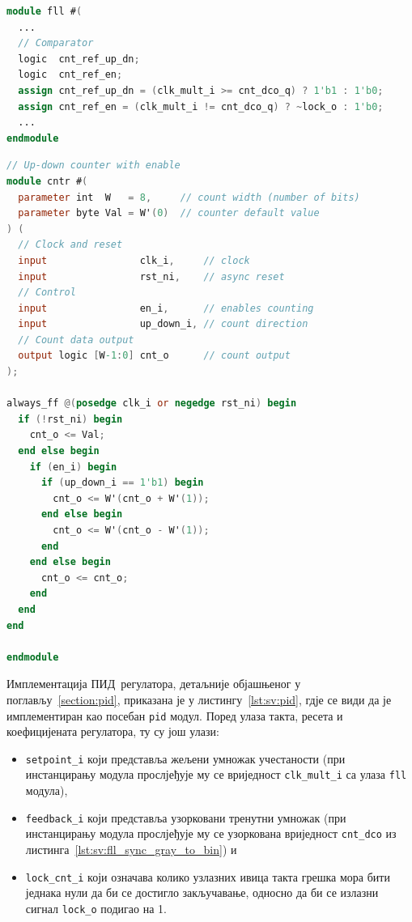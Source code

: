 \documentclass[master]{finthesis}
\newcommand*{\prog}[1]{\texttt{#1}}
\def \PID  {ПИД} %
\begin{document}
\begin{lstlisting}[language=Verilog, caption={Компараторски дио двостепеног регулатора.}, label={lst:sv:bang_bang:comparator}]
module fll #(
  ...
  // Comparator
  logic  cnt_ref_up_dn;
  logic  cnt_ref_en;
  assign cnt_ref_up_dn = (clk_mult_i >= cnt_dco_q) ? 1'b1 : 1'b0;
  assign cnt_ref_en = (clk_mult_i != cnt_dco_q) ? ~lock_o : 1'b0;
  ...
endmodule
\end{lstlisting}
\begin{lstlisting}[language=Verilog, caption={Имплементација бројача из двостепеног регулатора.}, label={lst:sv:bang_bang:cnt}]
// Up-down counter with enable
module cntr #(
  parameter int  W   = 8,     // count width (number of bits)
  parameter byte Val = W'(0)  // counter default value
) (
  // Clock and reset
  input                clk_i,     // clock
  input                rst_ni,    // async reset
  // Control
  input                en_i,      // enables counting
  input                up_down_i, // count direction
  // Count data output
  output logic [W-1:0] cnt_o      // count output
);

always_ff @(posedge clk_i or negedge rst_ni) begin
  if (!rst_ni) begin
    cnt_o <= Val;
  end else begin
    if (en_i) begin
      if (up_down_i == 1'b1) begin
        cnt_o <= W'(cnt_o + W'(1));
      end else begin
        cnt_o <= W'(cnt_o - W'(1));
      end
    end else begin
      cnt_o <= cnt_o;
    end
  end
end

endmodule
\end{lstlisting}
Имплементација \PID\ регулатора, детаљније објашњеног у поглављу~\ref{section:pid}, приказана је у листингу~\ref{lst:sv:pid}, гдје се види да је имплементиран као посебан \prog{pid} модул. Поред улаза такта, ресета и коефицијената регулатора, ту су још улази:
\begin{itemize}
	\item \prog{setpoint\_i} који представља жељени умножак учестаности (при инстанцирању модула прослјеђује му се вриједност \prog{clk\_mult\_i} са улаза \prog{fll} модула),
	\item \prog{feedback\_i} који представља узорковани тренутни умножак (при инстанцирању модула прослјеђује му се узоркована вриједност \prog{cnt\_dco} из листинга~\ref{lst:sv:fll_sync_gray_to_bin}) и
	\item \prog{lock\_cnt\_i} који означава колико узлазних ивица такта грешка мора бити једнака нули да би се достигло закључавање, односно да би се излазни сигнал \prog{lock\_o} подигао на 1.
\end{itemize}
\end{document}
